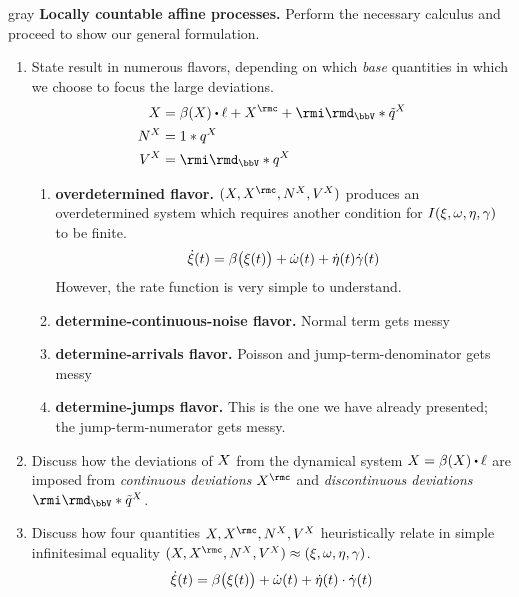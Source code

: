 \begin{color}{gray}
  {\bfseries Locally countable affine processes.}
  Perform the necessary calculus and proceed to show our general formulation.
  \begin{enumerate}
    \item
      State result in numerous flavors, depending on which \emph{base} quantities in which we choose to focus the large deviations.
      \begin{align*}
        \X &= \affDrift(\X)\shortInt \leb + \X^\rmc + \id_\vecSpace \ast \compensate{\jumpMeas^\X} \\
        \N^\X &= 1 \ast \jumpMeas^\X \\
        V^\X &= \id_\vecSpace \ast \jumpMeas^\X 
      \end{align*}
      \begin{enumerate}
        \item
          \textbf{overdetermined flavor.}
          $(\X, \X^\rmc, \N^\X, V^\X)$ produces an overdetermined system which requires another condition for $I(\xi, \omega, \eta, \gamma)$ to be finite.
          \[
            \dot{\xi}(t) = \beta\big(\xi(t)\big) + \dot\omega(t) + \dot\eta(t)\dot\gamma(t)
          \]
          However, the rate function is very simple to understand.
        \item
          \textbf{determine-continuous-noise flavor.}
          Normal term gets messy
        \item
          \textbf{determine-arrivals flavor.}
          Poisson and jump-term-denominator gets messy
        \item
          \textbf{determine-jumps flavor.}
          This is the one we have already presented; the jump-term-numerator gets messy.
      \end{enumerate}
    \item
      Discuss how the deviations of $X$ from the dynamical system $\X = \affDrift(\X) \shortInt \leb$ are imposed from \emph{continuous deviations} $\X^\rmc$ and \emph{discontinuous deviations} $\id_\vecSpace \ast \compensate{\jumpMeas^\X}$.
    \item
      Discuss how four quantities $\X, \X^\rmc, \N^\X, V^\X$ heuristically relate in simple infinitesimal equality $(\X, \X^\rmc, \N^\X, V^\X) \approx (\pathVar, \omega, \eta, \gamma)$.
      \begin{align*}
        \dot{\xi}(t) = \beta\big(\xi(t)\big) + \dot\omega(t) + \dot\eta(t) \cdot \dot\gamma(t)
      \end{align*}

\end{enumerate}
\end{color}
